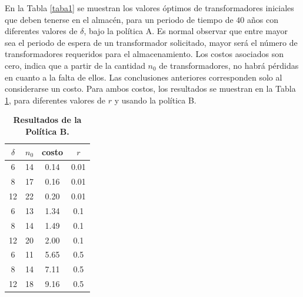 \noindent En la Tabla \ref{taba1} se muestran los valores \'optimos de transformadores iniciales que deben tenerse en el almac\'en, para un periodo de tiempo de $40$ a\~nos con diferentes valores de $\delta$, bajo la pol\'itica A. Es normal observar que entre mayor sea el periodo de espera de un transformador solicitado, mayor ser\'a el n\'umero de transformadores requeridos para el almacenamiento. Los costos asociados son cero, indica que a partir de la cantidad $n_0$ de transformadores, no habr\'a p\'erdidas en cuanto a la falta de ellos. Las conclusiones anteriores corresponden solo al considerarse un costo. Para ambos costos, los resultados se muestran en la Tabla \ref{resu2}, para diferentes valores de $r$ y usando la pol\'itica B.


\begin{table}[ht]\small
\begin{center}
\caption{\bf Resultados de la Pol\'itica B.}\label{resu2}
\vspace{0.3cm}\begin{tabular}{cccc}
\toprule[0.6mm]
 $\delta$ & $n_0$  & costo& $r$\\
\toprule[0.6mm]
  6   & 14 & 0.14& 0.01\\
  8   & 17 & 0.16& 0.01\\
  12 & 22  & 0.20 & 0.01\\
  \hline
  6   & 13 & 1.34& 0.1\\
  8   & 14 & 1.49& 0.1\\
  12 & 20 & 2.00& 0.1\\
  \hline
  6   & 11& 5.65 &0.5 \\
  8   & 14 &7.11 & 0.5 \\
  12 & 18 &9.16 &0.5\\
\toprule[0.6mm]
\end{tabular}
\end{center}

\end{table}






